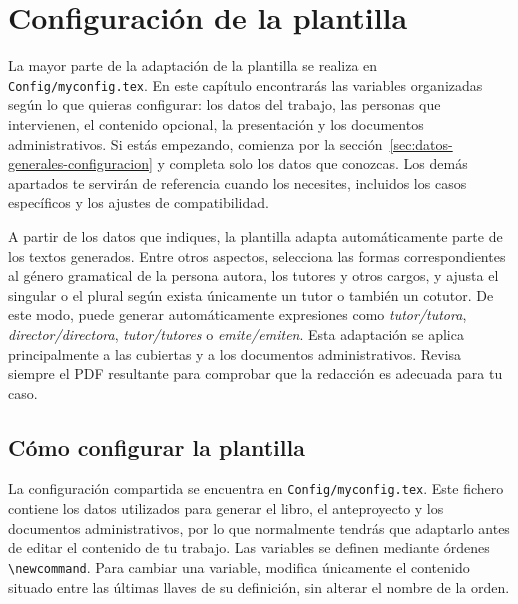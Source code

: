 %

\chapter{Configuración de la plantilla}
\label{cha:configuracion}

La mayor parte de la adaptación de la plantilla se realiza en \texttt{Config/myconfig.tex}. En este capítulo encontrarás las variables organizadas según lo que quieras configurar: los datos del trabajo, las personas que intervienen, el contenido opcional, la presentación y los documentos administrativos. Si estás empezando, comienza por la sección~\ref{sec:datos-generales-configuracion} y completa solo los datos que conozcas. Los demás apartados te servirán de referencia cuando los necesites, incluidos los casos específicos y los ajustes de compatibilidad.

A partir de los datos que indiques, la plantilla adapta automáticamente parte de los textos generados. Entre otros aspectos, selecciona las formas correspondientes al género gramatical de la persona autora, los tutores y otros cargos, y ajusta el singular o el plural según exista únicamente un tutor o también un cotutor. De este modo, puede generar automáticamente expresiones como \emph{tutor/tutora}, \emph{director/directora}, \emph{tutor/tutores} o \emph{emite/emiten}. Esta adaptación se aplica principalmente a las cubiertas y a los documentos administrativos. Revisa siempre el PDF resultante para comprobar que la redacción es adecuada para tu caso.

\section{Cómo configurar la plantilla}
\label{sec:definicion-del-tipo}

La configuración compartida se encuentra en \texttt{Config/myconfig.tex}. Este fichero contiene los datos utilizados para generar el libro, el anteproyecto y los documentos administrativos, por lo que normalmente tendrás que adaptarlo antes de editar el contenido de tu trabajo. Las variables se definen mediante órdenes \texttt{\textbackslash{}newcommand}. Para cambiar una variable, modifica únicamente el contenido situado entre las últimas llaves de su definición, sin alterar el nombre de la orden.

